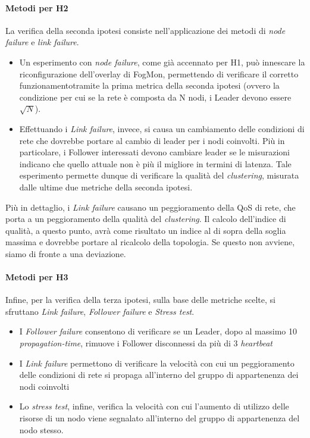     
    \paragraph{Metodi per H2}
    
    La verifica della seconda ipotesi consiste nell'applicazione dei metodi di \textit{node failure} e \textit{link failure}.
    \begin{itemize}
        \item Un esperimento con \textit{node failure}, come già accennato per H1, può innescare la riconfigurazione dell'overlay di FogMon, permettendo di verificare il corretto funzionamentotramite la prima metrica della seconda ipotesi (ovvero la condizione per cui se la rete è composta da N nodi, i Leader devono essere $\sqrt{N}$).
        
        \item  Effettuando i \emph{Link failure}, invece, si causa un cambiamento delle condizioni di rete che dovrebbe portare al cambio di leader per i nodi coinvolti. Più in particolare, i Follower interessati devono cambiare leader se le misurazioni indicano che quello attuale non è più il migliore in termini di latenza. Tale esperimento permette dunque di verificare la qualità del \textit{clustering}, misurata dalle ultime due metriche della seconda ipotesi.
    \end{itemize}
    Più in dettaglio, i \emph{Link failure} causano un peggioramento della QoS di rete, che porta a un peggioramento della qualità del \textit{clustering}. Il calcolo dell'indice di qualità, a questo punto, avrà come risultato un indice al di sopra della soglia massima e dovrebbe portare al ricalcolo della topologia. Se questo non avviene, siamo di fronte a una deviazione.
    
    
    \paragraph{Metodi per H3}
    
    Infine, per la verifica della terza ipotesi, sulla base delle metriche scelte, si sfruttano \textit{Link failure}, \textit{Follower failure} e \textit{Stress test}.
    \begin {itemize}
        \item I \textit{Follower failure} consentono di verificare se un Leader, dopo al massimo 10 \textit{propagation-time}, rimuove i Follower disconnessi da più di 3 \textit{heartbeat}
        \item I \textit{Link failure} permettono di verificare la velocità con cui un peggioramento delle condizioni di rete si propaga all'interno del gruppo di appartenenza dei nodi coinvolti
        \item Lo \textit{stress test}, infine, verifica la velocità con cui l'aumento di utilizzo delle risorse di un nodo viene segnalato all'interno del gruppo di appartenenza del nodo stesso.
    \end {itemize}
